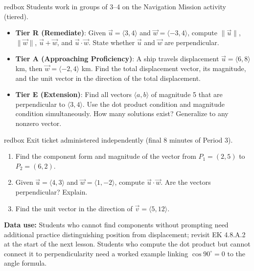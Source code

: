 \documentclass[10pt]{article}
\begin{document}
\vspace{0.08in}

\begin{skillbox}{redbox}
Students work in groups of 3--4 on the Navigation Mission activity (tiered).

\begin{itemize}[leftmargin=1.4em, itemsep=4pt]
  \item \textbf{Tier R (Remediate)}: Given $\vec{u}=\langle 3,4\rangle$ and
    $\vec{w}=\langle -3,4\rangle$, compute $\|\vec{u}\|$, $\|\vec{w}\|$,
    $\vec{u}+\vec{w}$, and $\vec{u}\cdot\vec{w}$. State whether $\vec{u}$ and
    $\vec{w}$ are perpendicular.
  \item \textbf{Tier A (Approaching Proficiency)}: A ship travels displacement
    $\vec{u}=\langle 6,8\rangle$ km, then $\vec{w}=\langle -2,4\rangle$ km.
    Find the total displacement vector, its magnitude, and the unit vector
    in the direction of the total displacement.
  \item \textbf{Tier E (Extension)}: Find all vectors $\langle a,b\rangle$ of
    magnitude 5 that are perpendicular to $\langle 3,4\rangle$. Use the dot
    product condition and magnitude condition simultaneously. How many solutions
    exist? Generalize to any nonzero vector.
\end{itemize}
\end{skillbox}

\vspace{0.08in}

\begin{skillbox}{redbox}
Exit ticket administered independently (final 8 minutes of Period 3).

\begin{enumerate}[leftmargin=1.4em, itemsep=4pt]
  \item Find the component form and magnitude of the vector from $P_1=(2,5)$
    to $P_2=(6,2)$.
  \item Given $\vec{u}=\langle 4,3\rangle$ and $\vec{w}=\langle 1,-2\rangle$,
    compute $\vec{u}\cdot\vec{w}$. Are the vectors perpendicular? Explain.
  \item Find the unit vector in the direction of $\vec{v}=\langle 5,12\rangle$.
\end{enumerate}

\textbf{Data use:} Students who cannot find components without prompting need
additional practice distinguishing position from displacement; revisit
EK 4.8.A.2 at the start of the next lesson. Students who compute the dot
product but cannot connect it to perpendicularity need a worked example
linking $\cos 90^\circ=0$ to the angle formula.
\end{skillbox}
\end{document}
